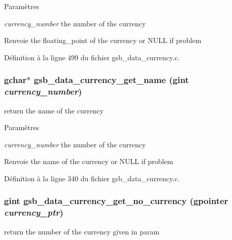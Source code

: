 \begin{DoxyParams}{Paramètres}
\item[{\em currency\_\-number}]the number of the currency\end{DoxyParams}
\begin{DoxyReturn}{Renvoie}
the floating\_\-point of the currency or NULL if problem 
\end{DoxyReturn}


Définition à la ligne 499 du fichier gsb\_\-data\_\-currency.c.

\subsubsection[{gsb\_\-data\_\-currency\_\-get\_\-name}]{\setlength{\rightskip}{0pt plus 5cm}gchar$\ast$ gsb\_\-data\_\-currency\_\-get\_\-name (gint {\em currency\_\-number})}\label{gsb__data__currency_8c_a0120c1acd462d7ad69ae349d74b23a34}
return the name of the currency


\begin{DoxyParams}{Paramètres}
\item[{\em currency\_\-number}]the number of the currency\end{DoxyParams}
\begin{DoxyReturn}{Renvoie}
the name of the currency or NULL if problem 
\end{DoxyReturn}


Définition à la ligne 340 du fichier gsb\_\-data\_\-currency.c.

\subsubsection[{gsb\_\-data\_\-currency\_\-get\_\-no\_\-currency}]{\setlength{\rightskip}{0pt plus 5cm}gint gsb\_\-data\_\-currency\_\-get\_\-no\_\-currency (gpointer {\em currency\_\-ptr})}\label{gsb__data__currency_8c_acaa91f6f1dbf289f4f00a0f598cdbfd4}
return the number of the currency given in param


